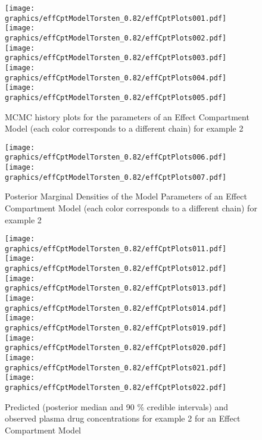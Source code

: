 \documentclass[11pt]{amsart}
\begin{document}
\clearpage

\begin{figure}[!htb]
\texttt{[image: graphics/effCptModelTorsten\_0.82/effCptPlots001.pdf]}
\texttt{[image: graphics/effCptModelTorsten\_0.82/effCptPlots002.pdf]}
\texttt{[image: graphics/effCptModelTorsten\_0.82/effCptPlots003.pdf]}
\texttt{[image: graphics/effCptModelTorsten\_0.82/effCptPlots004.pdf]}
\texttt{[image: graphics/effCptModelTorsten\_0.82/effCptPlots005.pdf]}
\caption{{MCMC history plots for the parameters of an Effect Compartment Model (each color corresponds to a different chain) for example 2}}
\label{effCptModelMCMC}
\end{figure}

\begin{figure}[!htb]
\texttt{[image: graphics/effCptModelTorsten\_0.82/effCptPlots006.pdf]}
\texttt{[image: graphics/effCptModelTorsten\_0.82/effCptPlots007.pdf]}
\caption{{Posterior Marginal Densities of the Model Parameters of an Effect Compartment Model (each color corresponds to a different chain) for example 2}}
\label{effCptModelDens}
\end{figure}

\begin{figure}[htbp]
\texttt{[image: graphics/effCptModelTorsten\_0.82/effCptPlots011.pdf]}
\texttt{[image: graphics/effCptModelTorsten\_0.82/effCptPlots012.pdf]}
\texttt{[image: graphics/effCptModelTorsten\_0.82/effCptPlots013.pdf]}
\texttt{[image: graphics/effCptModelTorsten\_0.82/effCptPlots014.pdf]}
\texttt{[image: graphics/effCptModelTorsten\_0.82/effCptPlots019.pdf]}
\texttt{[image: graphics/effCptModelTorsten\_0.82/effCptPlots020.pdf]}
\texttt{[image: graphics/effCptModelTorsten\_0.82/effCptPlots021.pdf]}
\texttt{[image: graphics/effCptModelTorsten\_0.82/effCptPlots022.pdf]}
\caption{{Predicted (posterior median and 90 \% credible intervals) and observed plasma drug concentrations for example 2 for an Effect Compartment Model}}
\label{effCptModelPredictionsPK}
\end{figure}
\end{document}
